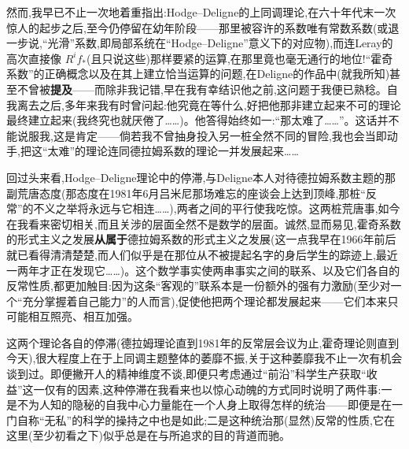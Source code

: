 \dmark{}然而,我早已不止一次地着重指出:Hodge--Deligne的上同调理论,在六十年代末一次惊人的起步之后,至今仍停留在幼年阶段——那里被容许的系数唯有常数系数(或退一步说,“光滑”系数,即局部系统在“Hodge--Deligne”意义下的对应物),而连Leray的高次直接像 $R^{i}f_{*}$(且只说这些)那样要紧的运算,在那里竟也毫无通行的地位!“霍奇系数”的正确概念以及在其上建立恰当运算的问题,在Deligne的作品中(就我所知)甚至不曾被\textbf{提及}——而除非我记错,早在我有幸结识他之前,这问题于我便已熟稔。自我离去之后,多年来我有时曾问起:他究竟在等什么,好把他那非建立起来不可的理论最终建立起来(我终究也就厌倦了……)。他答得始终如一:“那太难了……”。这话并不能说服我,这是肯定——倘若我不曾抽身投入另一桩全然不同的冒险,我也会当即动手,把这“太难”的理论连同德拉姆系数的理论一并发展起来……

\noindent 回过头来看,Hodge--Deligne理论中的停滞,与Deligne本人对待德拉姆系数主题的那副荒唐态度(那态度在1981年6月吕米尼那场难忘的座谈会上达到顶峰\dmark{},那桩“反常”的不义之举将永远与它相连……),两者之间的平行使我吃惊。这两桩荒唐事,如今在我看来密切相关,而且关涉的层面全然不是数学的层面。诚然,显而易见,霍奇系数的形式主义之发展\textbf{从属于}德拉姆系数的形式主义之发展(这一点我早在1966年前后就已看得清清楚楚,而人们似乎是在那位从不被提起名字的身后学生的踪迹上,最近一两年才正在发现它……)。这个数学事实使两串事实之间的联系、以及它们各自的反常性质,都更加触目:因为这条“客观的”联系本是一份额外的强有力激励(至少对一个“充分掌握着自己能力”的人而言),促使他把两个理论都发展起来——它们本来只可能相互照亮、相互加强。

\noindent 这两个理论各自的停滞(德拉姆理论直到1981年的反常层会议为止,霍奇理论则直到今天),很大程度上在于上同调主题整体的萎靡不振,关于这种萎靡我不止一次有机会谈到过。即便撇开人的精神维度不谈,即便只考虑通过“前沿”科学生产获取“收益”这一仅有的因素,这种停滞在我看来也以惊心动魄的方式同时说明了两件事:一是不为人知的隐秘的自我中心力量能在一个人身上取得怎样的统治——即便是在一门自称“无私”的科学的操持之中也是如此;二是这种统治那(显然)反常的性质,它在这里(至少初看之下)似乎总是在与所追求的目的背道而驰。

